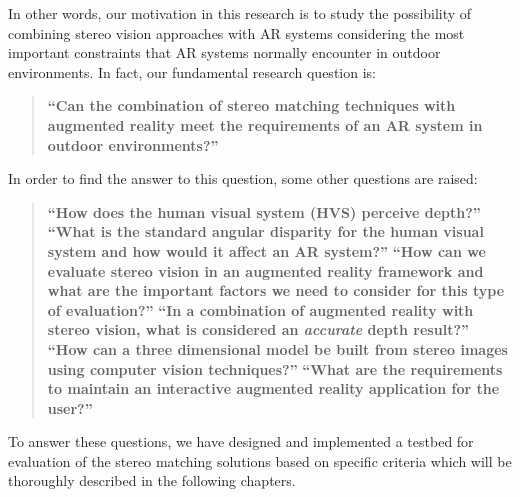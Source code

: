 In other words, our motivation in this research is to study the possibility of combining stereo vision approaches with 
AR systems considering the most important constraints that AR systems
normally encounter in outdoor environments. 
In fact, our fundamental research question is: \newline

\begin{quote}
\textbf{``Can the combination of stereo matching techniques with augmented reality meet the requirements of an AR system in outdoor 
environments?''} \newline
\end{quote}

In order to find the answer to this question, some other questions are raised:
\begin{quote}
\textbf {``How does the human visual system (HVS) perceive depth?''}\newline
\textbf {``What is the standard angular disparity for the human visual system and how would it affect an AR system?''} \newline
\textbf {``How can we evaluate stereo vision in an augmented reality framework and what are the important factors we need to consider for 
	this type of evaluation?''} \newline
\textbf {``In a combination of augmented reality with stereo vision, what is considered an \textbf{\textit {accurate}} depth result?''} \newline
\textbf {``How can a three dimensional model be built from stereo images using computer vision techniques?''}\newline
\textbf {``What are the requirements to maintain an interactive augmented reality application for the user?''} \newline
\end{quote}

To answer these questions, we have designed and implemented a testbed for evaluation of
the stereo matching solutions based on specific criteria which will be thoroughly described in the following chapters.

